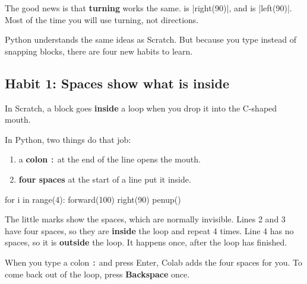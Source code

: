 The good news is that \textbf{turning} works the same.  is \py|right(90)|, and  is \py|left(90)|. Most of the time you will use turning, not directions.


Python understands the same ideas as Scratch. But because you type instead of snapping blocks, there are four new habits to learn.

\subsection*{Habit 1: Spaces show what is inside}

In Scratch, a block goes \textbf{inside} a loop when you drop it into the C-shaped mouth.

In Python, two things do that job:
\begin{enumerate}
  \item a \textbf{colon} \texttt{:} at the end of the line opens the mouth.
  \item \textbf{four spaces} at the start of a line put it inside.
\end{enumerate}

\begin{tcbraster}[raster columns=2, raster equal height=rows, raster column skip=12pt, raster valign=center]
\begin{tcolorbox}[colback=white, colframe=white, boxrule=0pt, valign=center]
\begin{scratch}
\end{scratch}
\end{tcolorbox}
\begin{spaces}
for i in range(4):
    forward(100)
    right(90)
penup()
\end{spaces}
\end{tcbraster}

The little \texttt{\textvisiblespace} marks show the spaces, which are normally invisible. Lines 2 and 3 have four spaces, so they are \textbf{inside} the loop and repeat 4 times. Line 4 has no spaces, so it is \textbf{outside} the loop. It happens once, after the loop has finished.

\begin{think}
When you type a colon \texttt{:} and press Enter, Colab adds the four spaces for you. To come back out of the loop, press \textbf{Backspace} once.
\end{think}

